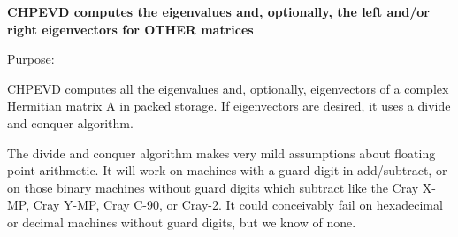 {\bfseries  C\+H\+P\+E\+V\+D computes the eigenvalues and, optionally, the left and/or right eigenvectors for O\+T\+H\+E\+R matrices} 

 \begin{DoxyParagraph}{Purpose\+: }
\begin{DoxyVerb} CHPEVD computes all the eigenvalues and, optionally, eigenvectors of
 a complex Hermitian matrix A in packed storage.  If eigenvectors are
 desired, it uses a divide and conquer algorithm.

 The divide and conquer algorithm makes very mild assumptions about
 floating point arithmetic. It will work on machines with a guard
 digit in add/subtract, or on those binary machines without guard
 digits which subtract like the Cray X-MP, Cray Y-MP, Cray C-90, or
 Cray-2. It could conceivably fail on hexadecimal or decimal machines
 without guard digits, but we know of none.\end{DoxyVerb}
 
\end{DoxyParagraph}

